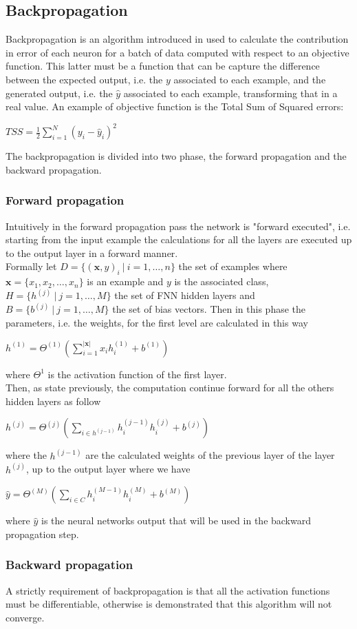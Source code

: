\subsection{Backpropagation}\label{subsec:backpropagation}
Backpropagation is an algorithm introduced in \cite{RUM:1986} used to calculate the contribution in error of each neuron for a batch of data computed with respect to an objective function. This latter must be a function that can be capture the difference between the expected output, i.e. the $y$ associated to each example, and the generated output, i.e. the $\hat{y}$ associated to each example, transforming that in a real value.
An example of objective function is the Total Sum of Squared errors:
\begin{center}
$TSS = \frac{1}{2}\sum\limits_{i=1}^{N}(y_i - \hat{y}_{i})^{2}$
\end{center}
The backpropagation is divided into two phase, the forward propagation and the backward propagation.

\subsubsection{Forward propagation}
Intuitively in the forward propagation pass the network is "forward executed", i.e. starting from the input example the calculations for all the layers are executed up to the output layer in a forward manner. \\
Formally let $D = \{(\textbf{x}, y)_i\ |\ i=1, \dots, n \}$ the set of examples where $\textbf{x} = \{x_1, x_2, \dots, x_n\}$ is an example and $y$ is the associated class, $H = \{h^{(j)}\ |\ j = 1, \dots, M\}$ the set of FNN hidden layers and $B = \{b^{(j)}\ |\ j=1, \dots, M\}$ the set of bias vectors. Then in this phase the parameters, i.e. the weights, for the first level are calculated in this way
\begin{center}
	$h^{(1)} = \Theta^{(1)}(\sum\limits_{i=1}^{|\textbf{x}|}{x_{i}h^{(1)}_{i}} + b^{(1)})$
\end{center}
where $\Theta^{1}$ is the activation function of the first layer.\\
Then, as state previously, the computation continue forward for all the others hidden layers as follow
\begin{center}
	$h^{(j)} = \Theta^{(j)}(\sum\limits_{i \in h^{(j - 1)}}h_{i}^{(j - 1)}h_{i}^{(j)} + b^{(j)})$
\end{center}
where the $h^{(j - 1)}$ are the calculated weights of the previous layer of the layer $h^{(j)}$, up to the output layer where we have
\begin{center}
	$\hat{y} = \Theta^{(M)}(\sum\limits_{i \in C}h_{i}^{(M - 1)}h_{i}^{(M)} + b^{(M)})$
\end{center}
where $\hat{y}$ is the neural networks output that will be used in the backward propagation step.

\subsubsection{Backward propagation}

A strictly requirement of backpropagation is that all the activation functions must be differentiable, otherwise is demonstrated that this algorithm will not converge.


